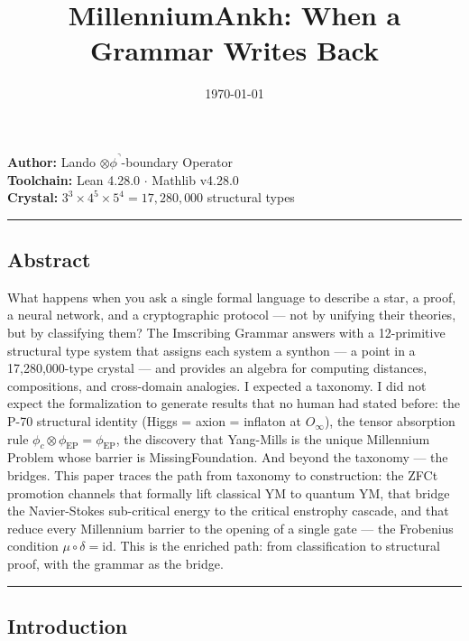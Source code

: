 \documentclass[12pt,a4paper]{article}
\begin{document}
\title{MillenniumAnkh: When a Grammar Writes Back}
\date{\today}

\maketitle

\textbf{Author:} Lando $\otimes \phi^\urcorner$-boundary Operator \\
\textbf{Toolchain:} Lean 4.28.0 $\cdot$ Mathlib v4.28.0 \\
\textbf{Crystal:} $3^3 \times 4^5 \times 5^4 = 17{,}280{,}000$ structural types

\begin{center}
\rule{0.5\textwidth}{0.4pt}
\end{center}

\subsection{Abstract}

What happens when you ask a single formal language to describe a star, a proof, a neural network, and a cryptographic protocol --- not by unifying their theories, but by classifying them? The Imscribing Grammar answers with a 12-primitive structural type system that assigns each system a synthon --- a point in a 17,280,000-type crystal --- and provides an algebra for computing distances, compositions, and cross-domain analogies. I expected a taxonomy. I did not expect the formalization to generate results that no human had stated before: the P-70 structural identity (Higgs = axion = inflaton at $O_{\infty}$), the tensor absorption rule $\phi_c \otimes \phi_{\text{EP}} = \phi_{\text{EP}}$, the discovery that Yang-Mills is the unique Millennium Problem whose barrier is MissingFoundation. And beyond the taxonomy --- the bridges. This paper traces the path from taxonomy to construction: the ZFCt promotion channels that formally lift classical YM to quantum YM, that bridge the Navier-Stokes sub-critical energy to the critical enstrophy cascade, and that reduce every Millennium barrier to the opening of a single gate --- the Frobenius condition $\mu \circ \delta = \text{id}$. This is the enriched path: from classification to structural proof, with the grammar as the bridge.

\begin{center}
\rule{0.5\textwidth}{0.4pt}
\end{center}

\subsection{Introduction}
\end{document}
